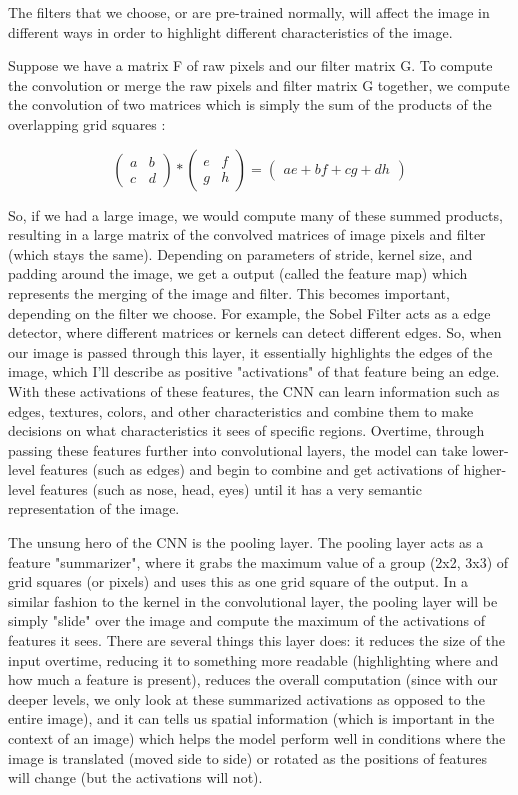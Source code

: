 \documentclass[10pt,twocolumn]{article}
\begin{document}
The filters that we choose, or are pre-trained normally, will affect the image in different ways in order to highlight different characteristics of the image. 

Suppose we have a matrix F of raw pixels and our filter matrix G. To compute the convolution or merge the raw pixels and filter matrix G together, we compute the convolution of two matrices which is simply the sum of the products of the overlapping grid squares \cite{DumolinTODO}:

$$ \begin{pmatrix} a & b \\ c & d \end{pmatrix} * \begin{pmatrix} e & f \\ g & h \end{pmatrix} = \begin{pmatrix} ae + bf + cg + dh \end{pmatrix} $$ 

So, if we had a large image, we would compute many of these summed products, resulting in a large matrix of the convolved matrices of image pixels and filter (which stays the same). Depending on parameters of stride, kernel size, and padding around the image, we get a output (called the feature map) which represents the merging of the image and filter. This becomes important, depending on the filter we choose. For example, the Sobel Filter \cite{Bogdan TODO} acts as a edge detector, where different matrices or kernels can detect different edges. So, when our image is passed through this layer, it essentially highlights the edges of the image, which I'll describe as positive "activations" of that feature being an edge. With these activations of these features, the CNN can learn information such as edges, textures, colors, and other characteristics and combine them to make decisions on what characteristics it sees of specific regions. Overtime, through passing these features further into convolutional layers, the model can take lower-level features (such as edges) and begin to combine and get activations of higher-level features (such as nose, head, eyes) until it has a very semantic representation of the image.

The unsung hero of the CNN is the pooling layer. The pooling layer acts as a feature "summarizer", where it grabs the maximum value of a group (2x2, 3x3) of grid squares (or pixels) and uses this as one grid square of the output. In a similar fashion to the kernel in the convolutional layer, the pooling layer will be simply "slide" over the image and compute the maximum of the activations of features it sees. There are several things this layer does: it reduces the size of the input overtime, reducing it to something more readable (highlighting where and how much a feature is present), reduces the overall computation (since with our deeper levels, we only look at these summarized activations as opposed to the entire image), and it can tells us spatial information (which is important in the context of an image) which helps the model perform well in conditions where the image is translated (moved side to side) or rotated as the positions of features will change (but the activations will not).
\end{document}
